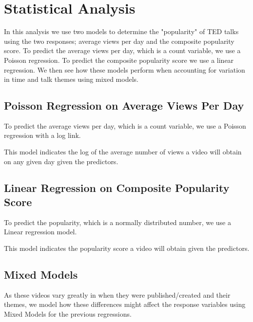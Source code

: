 \section{Statistical Analysis}
In this analysis we use two models to determine the "popularity" of TED talks using the two responses; average views per day and the composite popularity score. To predict the average views per day, which is a count variable, we use a Poisson regression. To predict the composite popularity score we use a linear regression. We then see how these models perform when accounting for variation in time and talk themes using mixed models. 

\subsection{Poisson Regression on Average Views Per Day}
To predict the average views per day, which is a count variable, we use a Poisson regression with a log link. 

This model indicates the log of the average number of views a video will obtain on any given day given the predictors.
\subsection{Linear Regression on Composite Popularity Score}
To predict the popularity, which is a normally distributed number, we use a Linear regression model.

This model indicates the popularity score a video will obtain given the predictors.

\subsection{Mixed Models}
As these videos vary greatly in when they were published/created and their themes, we model how these differences might affect the response variables using Mixed Models for the previous regressions. 
